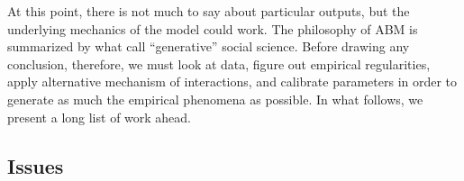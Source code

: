 \documentclass[11pt, oneside]{article}
\begin{document}
\noindent At this point, there is not much to say about particular outputs, but the underlying mechanics of the model could work. The philosophy of ABM is summarized by what \textcite{Epstein1996} call ``generative'' social science. Before drawing any conclusion, therefore, we must look at data, figure out empirical regularities, apply alternative mechanism of interactions, and calibrate parameters in order to generate as much the empirical phenomena as possible. In what follows, we present a long list of work ahead.

\subsection{Issues}



\vspace{5mm}

\printbibliography[heading=bibintoc]
\end{document}
